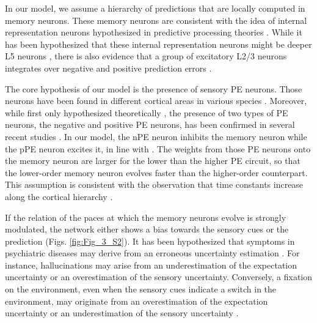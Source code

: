 \documentclass[10pt,a4paper]{article}
\begin{document}
In our model, we assume a hierarchy of predictions that are locally computed in memory neurons. These memory neurons are consistent with the idea of internal representation neurons hypothesized in predictive processing theories \citep{bastos2012canonical, keller2018predictive}. While it has been hypothesized that these internal representation neurons might be deeper L5 neurons \citep{bastos2012canonical, heindorf2022reduction}, there is also evidence that a group of excitatory L2/3 neurons integrates over negative and positive prediction errors \citep{o2022prediction}.

The core hypothesis of our model is the presence of sensory PE neurons. Those neurons have been found in different cortical areas in various species \citep{eliades2008neural, keller2009neural, ayaz2019layer, audette2021temporally}. Moreover, while first only hypothesized theoretically \citep{rao1999predictive}, the presence of two types of PE neurons, the negative and positive PE neurons, has been confirmed in several recent studies \citep{keller2012sensorimotor, attinger2017visuomotor, jordan2020opposing, audette2021temporally}. In our model, the nPE neuron inhibits the memory neuron while the pPE neuron excites it, in line with \cite{keller2018predictive}. The weights from those PE neurons onto the memory neuron are larger for the lower than the higher PE circuit, so that the lower-order memory neuron evolves faster than the higher-order counterpart. This assumption is consistent with the observation that time constants increase along the cortical hierarchy \citep{murray2014hierarchy, chaudhuri2015large, runyan2017distinct}.

If the relation of the paces at which the memory neurons evolve is strongly modulated, the network either shows a bias towards the sensory cues or the prediction (Figs. \ref{fig:Fig_3_S2}). It has been hypothesized that symptoms in psychiatric diseases may derive from an erroneous uncertainty estimation \citep{yon2021precision}. For instance, hallucinations may arise from an underestimation of the expectation uncertainty or an overestimation of the sensory uncertainty. Conversely, a fixation on the environment, even when the sensory cues indicate a switch in the environment, may originate from an overestimation of the expectation uncertainty or an underestimation of the sensory uncertainty \citep{yon2021precision}.
\end{document}
